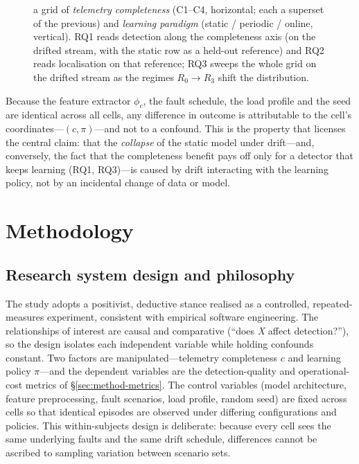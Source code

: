 \documentclass[pdflatex,sn-mathphys-num]{sn-jnl}%
\theoremstyle{thmstyleone}%
\theoremstyle{thmstyletwo}%
\theoremstyle{thmstylethree}%
\begin{document}
\begin{figure}[t]
{a grid of \emph{telemetry completeness} (C1--C4, horizontal; each a superset of the
previous) and \emph{learning paradigm} (static / periodic / online, vertical).
RQ1 reads detection along the completeness axis (on the drifted stream, with the static
row as a held-out reference) and RQ2 reads localisation on that reference; RQ3 sweeps
the whole grid on the drifted stream as the regimes $R_0\!\rightarrow\!R_3$ shift the
distribution.}\label{fig:design}
\end{figure} Because the feature extractor $\phi_c$, the fault schedule, the load profile and the seed are identical across all cells, any difference in outcome is attributable to the cell's coordinates---$(c, \pi)$---and not to a confound. This is the property that licenses the central claim: that the \emph{collapse} of the static model under drift---and, conversely, the fact that the completeness benefit pays off only for a detector that keeps learning (RQ1, RQ3)---is caused by drift interacting with the learning policy, not by an incidental change of data or model.

\section{Methodology}\label{sec:method}

\subsection{Research system design and philosophy}\label{sec:method-design}

The study adopts a positivist, deductive stance realised as a controlled, repeated-measures experiment, consistent with empirical software engineering. The relationships of interest are causal and comparative (``does \emph{X} affect detection?''), so the design isolates each independent variable while holding confounds constant. Two factors are manipulated---telemetry completeness $c$ and learning policy $\pi$---and the dependent variables are the detection-quality and operational-cost metrics of \S\ref{sec:method-metrics}. The control variables (model architecture, feature preprocessing, fault scenarios, load profile, random seed) are fixed across cells so that identical episodes are observed under differing configurations and policies. This within-subjects design is deliberate: because every cell sees the same underlying faults and the same drift schedule, differences cannot be ascribed to sampling variation between scenario sets.
\end{document}
